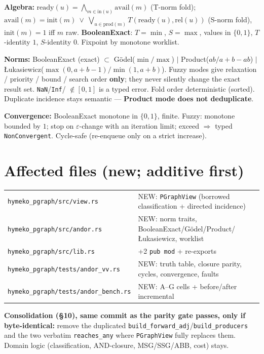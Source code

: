 \documentclass[11pt]{article}
\begin{document}
\textbf{Algebra:} $\text{ready}(u)=\bigwedge_{m\in\text{in}(u)}\text{avail}(m)$ (T-norm fold);
$\text{avail}(m)=\text{init}(m)\ \vee\ \bigvee_{u\in\text{prod}(m)} T(\text{ready}(u),\text{rel}(u))$
(S-norm fold), $\text{init}(m)=1$ iff $m$ raw. \textbf{BooleanExact}: $T=\min$, $S=\max$, values in
$\{0,1\}$, $T$-identity $1$, $S$-identity $0$. Fixpoint by monotone worklist.

\textbf{Norms:} BooleanExact (exact) $\subset$ G\"odel($\min/\max$) $\mid$ Product($ab / a{+}b{-}ab$) $\mid$
\L{}ukasiewicz($\max(0,a{+}b{-}1)/\min(1,a{+}b)$). Fuzzy modes give relaxation / priority / bound / search
order \textbf{only}; they never silently change the exact result set. \texttt{NaN}/\texttt{Inf}/
$\notin[0,1]$ is a typed error. Fold order deterministic (sorted). Duplicate incidence stays semantic ---
\textbf{Product mode does not deduplicate}.

\textbf{Convergence:} BooleanExact monotone in $\{0,1\}$, finite. Fuzzy: monotone bounded by $1$; stop on
$\varepsilon$-change with an iteration limit; exceed $\Rightarrow$ typed \texttt{NonConvergent}. Cycle-safe
(re-enqueue only on a strict increase).

\section*{Affected files (new; additive first)}
\begin{longtable}{l l}
\texttt{hymeko\_pgraph/src/view.rs} & NEW: \texttt{PGraphView} (borrowed classification + directed incidence) \\
\texttt{hymeko\_pgraph/src/andor.rs} & NEW: norm traits, BooleanExact/G\"odel/Product/\L{}ukasiewicz, worklist \\
\texttt{hymeko\_pgraph/src/lib.rs} & +2 \texttt{pub mod} + re-exports \\
\texttt{hymeko\_pgraph/tests/andor\_vv.rs} & NEW: truth table, closure parity, cycles, convergence, faults \\
\texttt{hymeko\_pgraph/tests/andor\_bench.rs} & NEW: A--G cells + before/after incremental \\
\end{longtable}
\textbf{Consolidation (§10), same commit as the parity gate passes, only if byte-identical:} remove the
duplicated \texttt{build\_forward\_adj}/\texttt{build\_producers} and the two verbatim \texttt{reaches\_any}
where \texttt{PGraphView} fully replaces them. Domain logic (classification, AND-closure, MSG/SSG/ABB,
cost) stays.
\end{document}
